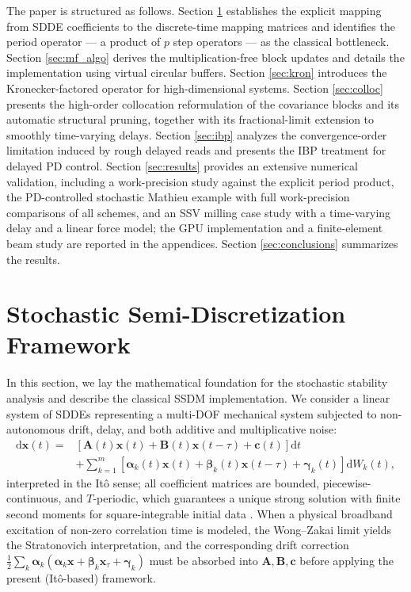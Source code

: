 \documentclass[preprint,12pt]{elsarticle}
\begin{document}
The paper is structured as follows. Section \ref{sec:theory} establishes the explicit mapping from SDDE coefficients to the discrete-time mapping matrices and identifies the period operator --- a product of $p$ step operators --- as the classical bottleneck. Section \ref{sec:mf_algo} derives the multiplication-free block updates and details the implementation using virtual circular buffers. Section \ref{sec:kron} introduces the Kronecker-factored operator for high-dimensional systems. Section \ref{sec:colloc} presents the high-order collocation reformulation of the covariance blocks and its automatic structural pruning, together with its fractional-limit extension to smoothly time-varying delays. Section \ref{sec:ibp} analyzes the convergence-order limitation induced by rough delayed reads and presents the IBP treatment for delayed PD control. Section \ref{sec:results} provides an extensive numerical validation, including a work-precision study against the explicit period product, the PD-controlled stochastic Mathieu example with full work-precision comparisons of all schemes, and an SSV milling case study with a time-varying delay and a linear force model; the GPU implementation and a finite-element beam study are reported in the appendices. Section \ref{sec:conclusions} summarizes the results.

\section{Stochastic Semi-Discretization Framework}
\label{sec:theory}

In this section, we lay the mathematical foundation for the stochastic stability analysis and describe the classical SSDM implementation. We consider a linear system of SDDEs representing a multi-DOF mechanical system subjected to non-autonomous drift, delay, and both additive and multiplicative noise:
\begin{equation}
\label{eq:sdde_theory}
\begin{split}
\mathrm{d}\mathbf{x}(t) = {}& \left[\mathbf{A}(t)\mathbf{x}(t) + \mathbf{B}(t)\mathbf{x}(t-\tau) + \mathbf{c}(t)\right] \mathrm{d}t \\
&+ \sum_{k=1}^m \left[\boldsymbol{\alpha}_k(t)\mathbf{x}(t) + \boldsymbol{\beta}_k(t)\mathbf{x}(t-\tau) + \boldsymbol{\gamma}_k(t)\right] \mathrm{d}W_k(t),
\end{split}
\end{equation}
interpreted in the It\^o sense; all coefficient matrices are bounded, piecewise-continuous, and $T$-periodic, which guarantees a unique strong solution with finite second moments for square-integrable initial data \cite{Mao2007}. When a physical broadband excitation of non-zero correlation time is modeled, the Wong--Zakai limit yields the Stratonovich interpretation, and the corresponding drift correction $\tfrac12\sum_k \boldsymbol\alpha_k(\boldsymbol\alpha_k \mathbf{x} + \boldsymbol\beta_k \mathbf{x}_\tau + \boldsymbol\gamma_k)$ must be absorbed into $\mathbf{A}, \mathbf{B}, \mathbf{c}$ before applying the present (It\^o-based) framework.
\end{document}
